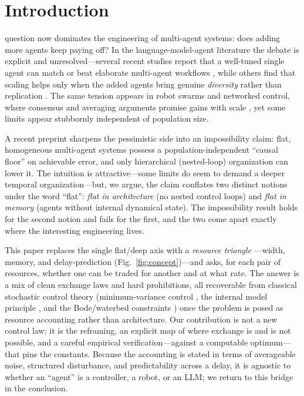 \documentclass[journal]{IEEEtran}
\begin{document}
\section{Introduction}
 question now dominates the engineering of
multi-agent systems: does adding more agents keep paying off? In the
language-model-agent literature the debate is explicit and unresolved---several
recent studies report that a well-tuned single agent can match or beat elaborate
multi-agent workflows \cite{xu2026single,tran2026single}, while others find that
scaling helps only when the added agents bring genuine \emph{diversity} rather
than replication \cite{qian2024scaling}. The same tension appears in robot
swarms and networked control, where consensus and averaging arguments promise
gains with scale \cite{olfati2007,jadbabaie2003,ren2005}, yet some limits appear
stubbornly independent of population size.

A recent preprint \cite{kovalov_preprint} sharpens the pessimistic side into an
impossibility claim: flat, homogeneous multi-agent systems possess a
population-independent ``causal floor'' on achievable error, and only
hierarchical (nested-loop) organization can lower it. The intuition is
attractive---some limits do seem to demand a deeper temporal organization---but,
we argue, the claim conflates two distinct notions under the word ``flat'':
\emph{flat in architecture} (no nested control loops) and \emph{flat in memory}
(agents without internal dynamical state). The impossibility result holds for
the second notion and fails for the first, and the two come apart exactly where
the interesting engineering lives.

This paper replaces the single flat/deep axis with a \emph{resource triangle}
---width, memory, and delay-prediction (Fig.~\ref{fig:concept})---and asks, for each pair of resources,
whether one can be traded for another and at what rate. The answer is a mix of
clean exchange laws and hard prohibitions, all recoverable from classical
stochastic control theory (minimum-variance control \cite{astrom1970,astrom1973},
the internal model principle \cite{francis1976}, and the Bode/waterbed
constraints \cite{bode1945,seron1997}) once the problem is posed as resource
accounting rather than architecture. Our contribution is not a new control law;
it is the reframing, an explicit map of where exchange is and is not possible,
and a careful empirical verification---against a computable optimum---that pins
the constants. Because the accounting is stated in terms of averageable noise,
structured disturbance, and predictability across a delay, it is agnostic to
whether an ``agent'' is a controller, a robot, or an LLM; we return to this
bridge in the conclusion.
\end{document}
